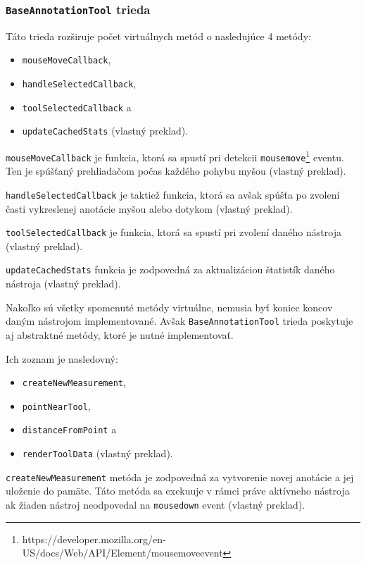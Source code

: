 \subsubsection* {\texttt{BaseAnnotationTool} trieda}
Táto trieda rozširuje počet virtuálnych metód o nasledujúce 4 metódy:
\begin {itemize}
\item {\texttt{mouseMoveCallback},}
\item {\texttt{handleSelectedCallback},}
\item {\texttt{toolSelectedCallback} a}
\item {\texttt{updateCachedStats} \cite{base_tool_description} (vlastný preklad).}
\end {itemize}

\texttt{mouseMoveCallback} je funkcia, ktorá sa spustí pri detekcii \texttt{mousemove}\footnote{https://developer.mozilla.org/en-US/docs/Web/API/Element/mousemove\textunderscore event} eventu. Ten je spúšťaný prehliadačom počas každého pohybu myšou \cite{base_tool_description} (vlastný preklad).

\texttt{handleSelectedCallback} je taktiež funkcia, ktorá sa avšak spúšťa po zvolení časti vykreslenej anotácie myšou alebo dotykom \cite{base_tool_description} (vlastný preklad).

\texttt{toolSelectedCallback} je funkcia, ktorá sa spustí pri zvolení daného nástroja \cite{base_tool_description} (vlastný preklad).

\texttt{updateCachedStats} funkcia je zodpovedná za aktualizáciou štatistík daného nástroja \cite{base_tool_description} (vlastný preklad).

Nakoľko sú všetky spomenuté metódy virtuálne, nemusia byť koniec koncov daným nástrojom implementované. Avšak \texttt{BaseAnnotationTool} trieda poskytuje aj abstraktné metódy, ktoré je nutné implementovať.

Ich zoznam je nasledovný:
\begin {itemize}
\item {\texttt{createNewMeasurement},}
\item {\texttt{pointNearTool},}
\item {\texttt{distanceFromPoint} a}
\item {\texttt{renderToolData} \cite{base_tool_description} (vlastný preklad).}
\end {itemize}

\texttt{createNewMeasurement} metóda je zodpovedná za vytvorenie novej anotácie a jej uloženie do pamäte. Táto metóda sa exekuuje v rámci práve aktívneho nástroja ak žiaden nástroj neodpovedal na \texttt{mousedown} event \cite{base_tool_description} (vlastný preklad).

